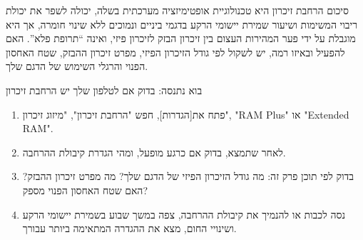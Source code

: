 \begin{tcbinfo}{סיכום}
הרחבת זיכרון היא טכנולוגיית אופטימיזציה מערכתית בשלה, יכולה לשפר את יכולת ריבוי המשימות ושיעור שמירת יישומי הרקע בדגמי ביניים ונמוכים ללא שינוי חומרה, אך היא מוגבלת על ידי פער המהירות העצום בין זיכרון הבזק לזיכרון פיזי, ואינה “תרופת פלא”. האם להפעיל ובאיזו רמה, יש לשקול לפי גודל הזיכרון הפיזי, מפרט זיכרון ההבזק, שטח האחסון הפנוי והרגלי השימוש של הדגם שלך.

\end{tcbinfo}

\begin{tcbpractice}{בוא נתנסה: בדוק אם לטלפון שלך יש הרחבת זיכרון}
\begin{enumerate}
  \item פתח את[הגדרות], חפש "הרחבת זיכרון", "מיזוג זיכרון", "RAM Plus" או "Extended RAM".
  \item לאחר שתמצא, בדוק אם כרגע מופעל, ומהי הגדרת קיבולת ההרחבה.
  \item בדוק לפי תוכן פרק זה: מה גודל הזיכרון הפיזי של הדגם שלך? מה מפרט זיכרון ההבזק? האם שטח האחסון הפנוי מספק?
  \item נסה לכבות או להנמיך את קיבולת ההרחבה, צפה במשך שבוע בשמירת יישומי הרקע ושינויי החום, מצא את ההגדרה המתאימה ביותר עבורך.
\end{enumerate}

\end{tcbpractice}
